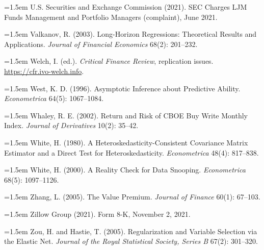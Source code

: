 \hangindent=1.5em U.S. Securities and Exchange Commission (2021). SEC Charges LJM Funds Management and Portfolio Managers (complaint), June 2021.

\hangindent=1.5em Valkanov, R. (2003). Long-Horizon Regressions: Theoretical Results and Applications. \emph{Journal of Financial Economics} 68(2): 201--232.

\hangindent=1.5em Welch, I. (ed.). \emph{Critical Finance Review}, replication issues. \url{https://cfr.ivo-welch.info}.

\hangindent=1.5em West, K. D. (1996). Asymptotic Inference about Predictive Ability. \emph{Econometrica} 64(5): 1067--1084.

\hangindent=1.5em Whaley, R. E. (2002). Return and Risk of CBOE Buy Write Monthly Index. \emph{Journal of Derivatives} 10(2): 35--42.

\hangindent=1.5em White, H. (1980). A Heteroskedasticity-Consistent Covariance Matrix Estimator and a Direct Test for Heteroskedasticity. \emph{Econometrica} 48(4): 817--838.

\hangindent=1.5em White, H. (2000). A Reality Check for Data Snooping. \emph{Econometrica} 68(5): 1097--1126.

\hangindent=1.5em Zhang, L. (2005). The Value Premium. \emph{Journal of Finance} 60(1): 67--103.

\hangindent=1.5em Zillow Group (2021). Form 8-K, November 2, 2021.

\hangindent=1.5em Zou, H. and Hastie, T. (2005). Regularization and Variable Selection via the Elastic Net. \emph{Journal of the Royal Statistical Society, Series B} 67(2): 301--320.

\endgroup
